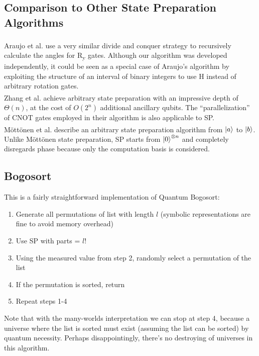 \documentclass[12pt]{article}
\begin{document}
\subsection{Comparison to Other State Preparation Algorithms}
Araujo et al.\textsuperscript{\cite{araujo}} use a very similar divide and conquer strategy to recursively calculate the angles for R\textsubscript{y} gates. Although our algorithm was developed independently, it could be seen as a special case of Araujo's algorithm by exploiting the structure of an interval of binary integers to use H instead of arbitrary rotation gates. \\

\noindent Zhang et al.\textsuperscript{\cite{zhang}} achieve arbitrary state preparation with an impressive depth of $\Theta(n)$, at the cost of $O(2^n)$ additional ancillary qubits. The ``parallelization'' of CNOT gates employed in their algorithm is also applicable to SP. \\

\noindent M\"ott\"onen et al.\textsuperscript{\cite{mottonen}} describe an arbitrary state preparation algorithm from $\ket{a}$ to $\ket{b}$. Unlike M\"ott\"onen state preparation, SP starts from $\ket{0}^{\otimes n}$ and completely disregards phase because only the computation basis is considered.
\subsection{Bogosort}
This is a fairly straightforward implementation of Quantum Bogosort:
\begin{enumerate}
    \item Generate all permutations of list with length $l$ (symbolic representations are fine to avoid memory overhead)
    \item Use SP with parts = $l!$
    \item Using the measured value from step 2, randomly select a permutation of the list
    \item If the permutation is sorted, return
    \item Repeat steps 1-4
\end{enumerate}
Note that with the many-worlds interpretation we can stop at step 4, because a universe where the list is sorted must exist (assuming the list can be sorted) by quantum necessity. Perhaps disappointingly, there's no destroying of universes in this algorithm.
\end{document}
